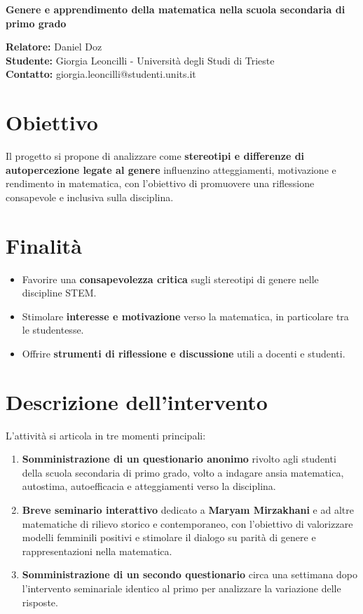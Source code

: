 \documentclass[12pt,a4paper]{article}
\begin{document}
\begin{center}
{\LARGE \textbf{Genere e apprendimento della matematica nella scuola secondaria di primo grado}}\\[6pt]
\end{center}

\vspace{0.5cm}

\noindent
\textbf{Relatore:} Daniel Doz\\
\textbf{Studente:} Giorgia Leoncilli - Università degli Studi di Trieste\\
\textbf{Contatto:} giorgia.leoncilli@studenti.units.it

\vspace{0.7cm}

\section*{Obiettivo}
Il progetto si propone di analizzare come \textbf{stereotipi e differenze di autopercezione legate al genere} influenzino atteggiamenti, motivazione e rendimento in matematica, con l'obiettivo di promuovere una riflessione consapevole e inclusiva sulla disciplina.

\section*{Finalità}
\begin{itemize}
    \item Favorire una \textbf{consapevolezza critica} sugli stereotipi di genere nelle discipline STEM.  
    \item Stimolare \textbf{interesse e motivazione} verso la matematica, in particolare tra le studentesse.  
    \item Offrire \textbf{strumenti di riflessione e discussione} utili a docenti e studenti.  
\end{itemize}

\section*{Descrizione dell'intervento}
L'attività si articola in tre momenti principali:
\begin{enumerate}
    \item \textbf{Somministrazione di un questionario anonimo} rivolto agli studenti della scuola secondaria di primo grado, volto a indagare ansia matematica, autostima, autoefficacia e atteggiamenti verso la disciplina.  
    \item \textbf{Breve seminario interattivo} dedicato a \textbf{Maryam Mirzakhani} e ad altre matematiche di rilievo storico e contemporaneo, con l'obiettivo di valorizzare modelli femminili positivi e stimolare il dialogo su parità di genere e rappresentazioni nella matematica.
    \item \textbf{Somministrazione di un secondo questionario} circa una settimana dopo l'intervento seminariale identico al primo per analizzare la variazione delle risposte.
\end{enumerate}
\end{document}

